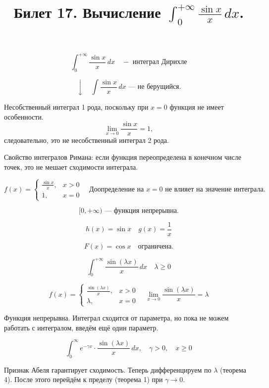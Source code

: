 \documentclass{article}
\title{Билет 17. Вычисление \( \int_{0}^{+\infty} \frac{\sin x}{x} \, dx \).}
\author{}
\date{}
\begin{document}
\maketitle

\[
\int_{0}^{+\infty} \frac{\sin x}{x} \, dx \quad - \text{ интеграл Дирихле}
\]

\[
\downarrow \quad \int \frac{\sin x}{x} \, dx \text{ — не берущийся.}
\]

Несобственный интеграл 1 рода, поскольку при \( x = 0 \) функция не имеет особенности.
\[
\lim_{x \to 0} \frac{\sin x}{x} = 1,
\]
следовательно, это не несобственный интеграл 2 рода.

Свойство интегралов Римана: если функция переопределена в конечном числе точек,
это не мешает сходимости интеграла.

\[
f(x) =
\begin{cases}
\frac{\sin x}{x}, & x > 0 \\
1, & x = 0
\end{cases}
\quad \text{Доопределение на } x=0 \text{ не влияет на значение интеграла.}
\]

\[
[0, +\infty) \text{ — функция непрерывна.}
\]


\[
h(x) = \sin x \quad g(x) = \frac{1}{x}
\]

\[
F(x) = \cos x \quad \text{ограничена.}
\]


\[
\int_{0}^{+\infty} \frac{\sin(\lambda x)}{x} \, dx \quad \lambda \geq 0
\]


\[
f(x) =
\begin{cases}
\frac{\sin(\lambda x)}{x}, & x > 0 \\
\lambda, & x = 0
\end{cases}
\quad \lim_{x \to 0} \frac{\sin(\lambda x)}{x} = \lambda
\]

Функция непрерывна. Интеграл сходится от параметра,
но пока не можем работать с интегралом, введём ещё один параметр.

\[
\int_{0}^{\infty} e^{-\gamma x} \cdot \frac{\sin(\lambda x)}{x} \, dx, \quad \gamma > 0, \quad x \geq 0
\]

Признак Абеля гарантирует сходимость.
Теперь дифференцируем по \( \lambda \) (теорема 4).
После этого перейдём к пределу (теорема 1) при \( \gamma \to 0 \).
\end{document}
